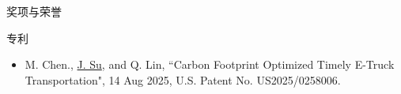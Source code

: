 \documentclass{resume} %
\begin{document}
\begin{rSection}{奖项与荣誉}
\begin{itemize}
    \end{itemize}
\end{rSection}





\begin{rSection}{专利}
    \begin{itemize}
        \item M. Chen., \underline{J. Su}, and Q. Lin, ``Carbon Footprint Optimized Timely E-Truck Transportation", 14 Aug 2025, U.S. Patent No. US2025/0258006.
    \end{itemize}
\end{rSection}
\end{document}
